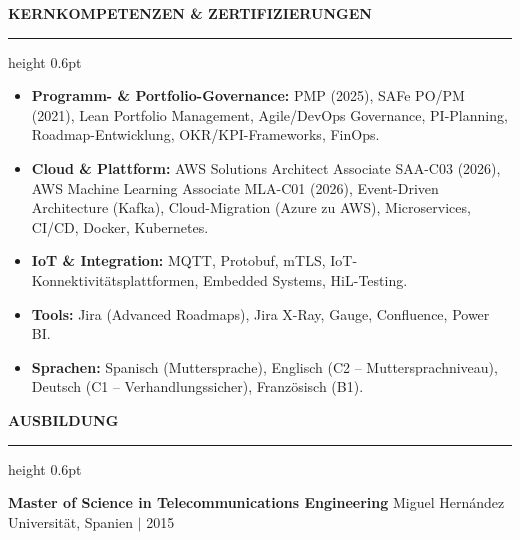 \documentclass[a4paper,10pt]{article}
\newcommand{\Section}[1]{%
  \vspace{11pt}%
  {\large\bfseries\uppercase{#1}}%
  \vspace{2pt}\par\noindent\hrule height 0.6pt%
  \vspace{5pt}%
}
\begin{document}
\Section{Kernkompetenzen \& Zertifizierungen}
\begin{itemize}
\item \textbf{Programm- \& Portfolio-Governance:} PMP (2025), SAFe PO/PM (2021), Lean Portfolio Management, Agile/DevOps Governance, PI-Planning, Roadmap-Entwicklung, OKR/KPI-Frameworks, FinOps.
\item \textbf{Cloud \& Plattform:} AWS Solutions Architect Associate SAA-C03 (2026), AWS Machine Learning Associate MLA-C01 (2026), Event-Driven Architecture (Kafka), Cloud-Migration (Azure zu AWS), Microservices, CI/CD, Docker, Kubernetes.
\item \textbf{IoT \& Integration:} MQTT, Protobuf, mTLS, IoT-Konnektivit{\"a}tsplattformen, Embedded Systems, HiL-Testing.
\item \textbf{Tools:} Jira (Advanced Roadmaps), Jira X-Ray, Gauge, Confluence, Power BI.
\item \textbf{Sprachen:} Spanisch (Muttersprache), Englisch (C2 -- Muttersprachniveau), Deutsch (C1 -- Verhandlungssicher), Franz{\"o}sisch (B1).
\end{itemize}

\Section{Ausbildung}
\textbf{Master of Science in Telecommunications Engineering} \hfill Miguel Hern\'{a}ndez Universit\"{a}t, Spanien $|$ 2015
\end{document}
